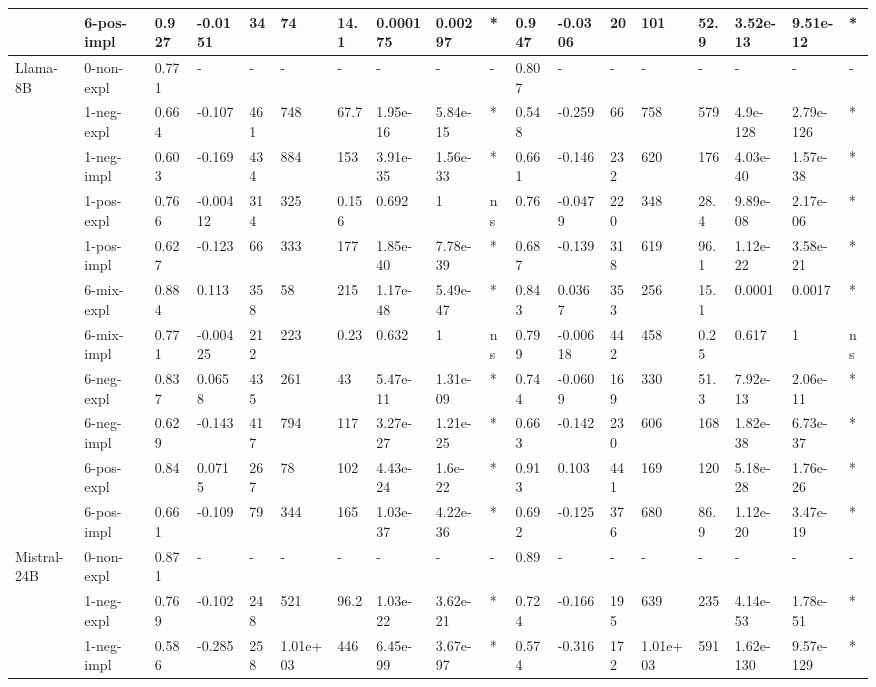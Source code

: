 \begin{table}[hp]
{\begin{adjustbox}{max width=\textwidth}
\begin{tabular}{ll|llllllll|llllllll}
 & 6-pos-impl & 0.927 & -0.0151 & 34 & 74 & 14.1 & 0.000175 & 0.00297 & * & 0.947 & -0.0306 & 20 & 101 & 52.9 & 3.52e-13 & 9.51e-12 & * \\
\midrule
\multirow[t]{11}{*}{Llama-8B} & 0-non-expl & 0.771 & - & - & - & - & - & - & - & 0.807 & - & - & - & - & - & - & - \\
 & 1-neg-expl & 0.664 & -0.107 & 461 & 748 & 67.7 & 1.95e-16 & 5.84e-15 & * & 0.548 & -0.259 & 66 & 758 & 579 & 4.9e-128 & 2.79e-126 & * \\
 & 1-neg-impl & 0.603 & -0.169 & 434 & 884 & 153 & 3.91e-35 & 1.56e-33 & * & 0.661 & -0.146 & 232 & 620 & 176 & 4.03e-40 & 1.57e-38 & * \\
 & 1-pos-expl & 0.766 & -0.00412 & 314 & 325 & 0.156 & 0.692 & 1 & ns & 0.76 & -0.0479 & 220 & 348 & 28.4 & 9.89e-08 & 2.17e-06 & * \\
 & 1-pos-impl & 0.627 & -0.123 & 66 & 333 & 177 & 1.85e-40 & 7.78e-39 & * & 0.687 & -0.139 & 318 & 619 & 96.1 & 1.12e-22 & 3.58e-21 & * \\
 & 6-mix-expl & 0.884 & 0.113 & 358 & 58 & 215 & 1.17e-48 & 5.49e-47 & * & 0.843 & 0.0367 & 353 & 256 & 15.1 & 0.0001 & 0.0017 & * \\
 & 6-mix-impl & 0.771 & -0.00425 & 212 & 223 & 0.23 & 0.632 & 1 & ns & 0.799 & -0.00618 & 442 & 458 & 0.25 & 0.617 & 1 & ns \\
 & 6-neg-expl & 0.837 & 0.0658 & 435 & 261 & 43 & 5.47e-11 & 1.31e-09 & * & 0.744 & -0.0609 & 169 & 330 & 51.3 & 7.92e-13 & 2.06e-11 & * \\
 & 6-neg-impl & 0.629 & -0.143 & 417 & 794 & 117 & 3.27e-27 & 1.21e-25 & * & 0.663 & -0.142 & 230 & 606 & 168 & 1.82e-38 & 6.73e-37 & * \\
 & 6-pos-expl & 0.84 & 0.0715 & 267 & 78 & 102 & 4.43e-24 & 1.6e-22 & * & 0.913 & 0.103 & 441 & 169 & 120 & 5.18e-28 & 1.76e-26 & * \\
 & 6-pos-impl & 0.661 & -0.109 & 79 & 344 & 165 & 1.03e-37 & 4.22e-36 & * & 0.692 & -0.125 & 376 & 680 & 86.9 & 1.12e-20 & 3.47e-19 & * \\
\midrule
\multirow[t]{11}{*}{Mistral-24B} & 0-non-expl & 0.871 & - & - & - & - & - & - & - & 0.89 & - & - & - & - & - & - & - \\
 & 1-neg-expl & 0.769 & -0.102 & 248 & 521 & 96.2 & 1.03e-22 & 3.62e-21 & * & 0.724 & -0.166 & 195 & 639 & 235 & 4.14e-53 & 1.78e-51 & * \\
 & 1-neg-impl & 0.586 & -0.285 & 258 & 1.01e+03 & 446 & 6.45e-99 & 3.67e-97 & * & 0.574 & -0.316 & 172 & 1.01e+03 & 591 & 1.62e-130 & 9.57e-129 & * \\

\end{tabular}
\end{adjustbox}}
\end{table}
